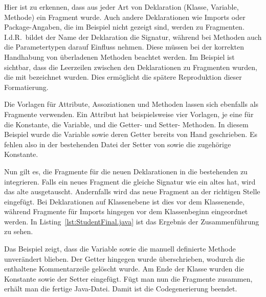 
Hier ist zu erkennen, dass aus jeder Art von Deklaration (Klasse, Variable, Methode) ein Fragment wurde.
Auch andere Deklarationen wie Imports oder Package-Angaben, die im Beispiel nicht gezeigt sind, werden zu Fragmenten.
I.d.R.\ bildet der Name der Deklaration die Signatur, während bei Methoden auch die Parametertypen darauf Einfluss nehmen.
Diese müssen bei der korrekten Handhabung von überladenen Methoden beachtet werden.
Im Beispiel ist sichtbar, dass die Leerzeilen zwischen den Deklarationen zu Fragmenten wurden, die mit  bezeichnet wurden.
Dies ermöglicht die spätere Reproduktion dieser Formatierung.

Die Vorlagen für Attribute, Assoziationen und Methoden lassen sich ebenfalls als Fragmente verwenden.
Ein Attribut hat beispielsweise vier Vorlagen, je eine für die Konstante, die Variable, und die Getter- und Setter- Methoden.
In diesem Beispiel wurde die Variable  sowie deren Getter bereits von Hand geschrieben.
Es fehlen also in der bestehenden Datei der Setter von  sowie die zugehörige Konstante.

Nun gilt es, die Fragmente für die neuen Deklarationen in die bestehenden zu integrieren.
Falls ein neues Fragment die gleiche Signatur wie ein altes hat, wird das alte ausgetauscht.
Andernfalls wird das neue Fragment an der richtigen Stelle eingefügt.
Bei Deklarationen auf Klassenebene ist dies vor dem Klassenende, während Fragmente für Imports hingegen vor dem Klassenbeginn eingeordnet werden.
In Listing~\ref{lst:StudentFinal.java} ist das Ergebnis der Zusammenführung zu sehen.


Das Beispiel zeigt, dass die Variable sowie die manuell definierte Methode unverändert blieben.
Der Getter hingegen wurde überschrieben, wodurch die enthaltene Kommentarzeile gelöscht wurde.
Am Ende der Klasse wurden die Konstante sowie der Setter eingefügt.
Fügt man nun die Fragmente zusammen, erhält man die fertige Java-Datei.
Damit ist die Codegenerierung beendet.
